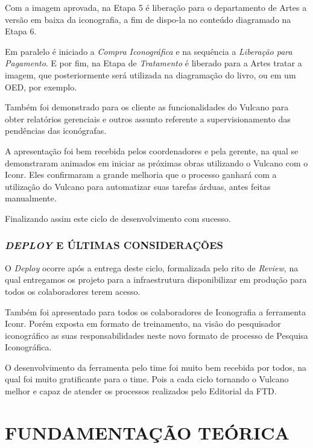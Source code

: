 \documentclass[
  12pt,            %
  openany,
  oneside,
  a4paper,         %
  english,      %
  brazil
]{article}
\numberwithin{figure}{section}
\numberwithin{table}{section}
\begin{document}
Com a imagem aprovada, na Etapa 5 é liberação para o departamento de Artes a versão em baixa da iconografia, a fim de dispo-la no conteúdo diagramado na Etapa 6.

Em paralelo é iniciado a \textit{Compra Iconográfica} e na sequência a \textit{Liberação para Pagamento}. E por fim, na Etapa de \textit{Tratamento} é liberado para a Artes tratar a imagem, que posteriormente será utilizada na diagramação do livro, ou em um OED, por exemplo.

Também foi demonstrado para os cliente as funcionalidades do Vulcano para obter relatórios gerenciais e outros assunto referente a supervisionamento das pendências das iconógrafas.

A apresentação foi bem recebida pelos coordenadores e pela gerente, na qual se demonstraram animados em iniciar as próximas obras utilizando o Vulcano com o Iconr. Eles confirmaram a grande melhoria que o processo ganhará com a utilização do Vulcano para automatizar suas tarefas árduas, antes feitas manualmente.

Finalizando assim este ciclo de desenvolvimento com sucesso.


\subsubsection{\textit{DEPLOY} E ÚLTIMAS CONSIDERAÇÕES}

O \textit{Deploy} ocorre após a entrega deste ciclo, formalizada pelo rito de \textit{Review}, na qual entregamos os projeto para a infraestrutura disponibilizar em produção para todos os colaboradores terem acesso.

Também foi apresentado para todos os colaboradores de Iconografia a ferramenta Iconr. Porém exposta em formato de treinamento, na visão do pesquisador iconográfico as suas responsabilidades neste novo formato de processo de Pesquisa Iconográfica.

O desenvolvimento da ferramenta pelo time foi muito bem recebida por todos, na qual foi muito gratificante para o time. Pois a cada ciclo tornando o Vulcano melhor e capaz de atender os processos realizados pelo Editorial da FTD.




\clearpage
\section{FUNDAMENTAÇÃO TEÓRICA}

\end{document}
